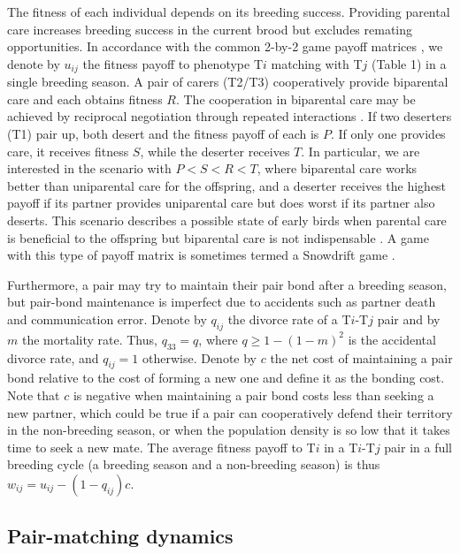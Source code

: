 \documentclass[12pt]{article}
\begin{document}
The fitness of each individual depends on its breeding success. Providing parental care increases breeding success in the current brood but excludes remating opportunities. In accordance with the common 2-by-2 game payoff matrices \citep{Santos.etal2006a}, we denote by $u_{ij}$ the fitness payoff to phenotype T$i$ matching with T$j$ (Table 1) in a single breeding season. A pair of carers (T2/T3) cooperatively provide biparental care and each obtains fitness $R$. The cooperation in biparental care may be achieved by reciprocal negotiation through repeated interactions \citep{Akcay.etal2009}. If two deserters (T1) pair up, both desert and the fitness payoff of each is $P$. If only one provides care, it receives fitness $S$, while the deserter receives $T$. In particular, we are interested in the scenario with $P<S<R<T$, where biparental care works better than uniparental care for the offspring, and a deserter receives the highest payoff if its partner provides uniparental care but does worst if its partner also deserts. This scenario describes a possible state of early birds when parental care is beneficial to the offspring but biparental care is not indispensable \citep{Ligon1999}. A game with this type of payoff matrix is sometimes termed a Snowdrift game \citep{Santos.etal2006a}.

Furthermore, a pair may try to maintain their pair bond after a breeding season, but pair-bond maintenance is imperfect due to accidents such as partner death and communication error. Denote by $q_{ij}$ the divorce rate of a T$i$-T$j$ pair and by $m$ the mortality rate. Thus, $q_{33}=q$, where $q \geq 1-(1-m)^2$ is the accidental divorce rate, and $q_{ij}=1$ otherwise. Denote by $c$ the net cost of maintaining a pair bond relative to the cost of forming a new one and define it as the bonding cost. Note that $c$ is negative when maintaining a pair bond costs less than seeking a new partner, which could be true if a pair can cooperatively defend their territory in the non-breeding season, or when the population density is so low that it takes time to seek a new mate. The average fitness payoff to T$i$ in a T$i$-T$j$ pair in a full breeding cycle (a breeding season and a non-breeding season) is thus $w_{ij} = u_{ij}-(1-q_{ij})c$. 

\subsection*{Pair-matching dynamics}
\end{document}
